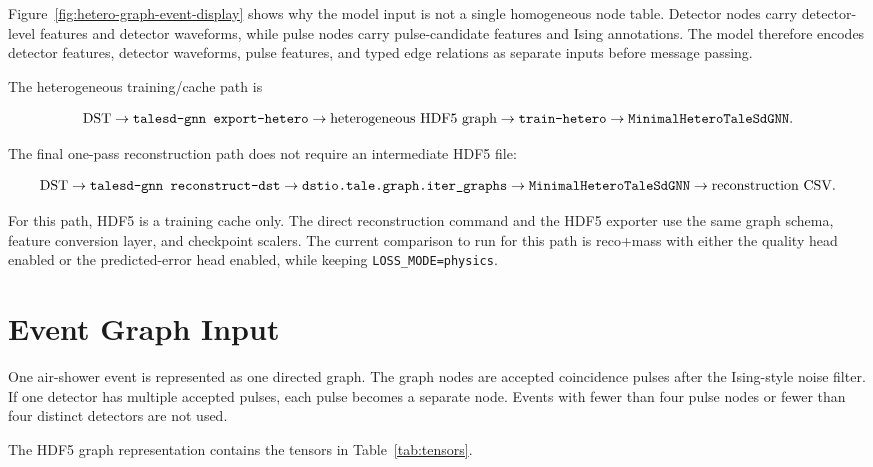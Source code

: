 \documentclass[a4paper,10pt]{article}
\newcommand{\code}[1]{\ifmmode\text{\ttfamily #1}\else\texttt{#1}\fi}
\begin{document}
Figure~\ref{fig:hetero-graph-event-display} shows why the model input is not a single homogeneous node table.
Detector nodes carry detector-level features and detector waveforms, while pulse nodes carry pulse-candidate features and Ising annotations.
The model therefore encodes detector features, detector waveforms, pulse features, and typed edge relations as separate inputs before message passing.

The heterogeneous training/cache path is
\begin{footnotesize}
\[
\mathrm{DST}
\rightarrow
\code{talesd-gnn export-hetero}
\rightarrow
\mathrm{heterogeneous\ HDF5\ graph}
\rightarrow
\code{train-hetero}
\rightarrow
\code{MinimalHeteroTaleSdGNN}.
\]
\end{footnotesize}
The final one-pass reconstruction path does not require an intermediate HDF5 file:
\begin{footnotesize}
\[
\mathrm{DST}
\rightarrow
\code{talesd-gnn reconstruct-dst}
\rightarrow
\code{dstio.tale.graph.iter\_graphs}
\rightarrow
\code{MinimalHeteroTaleSdGNN}
\rightarrow
\mathrm{reconstruction\ CSV}.
\]
\end{footnotesize}
For this path, HDF5 is a training cache only.
The direct reconstruction command and the HDF5 exporter use the same graph schema, feature conversion layer, and checkpoint scalers.
The current comparison to run for this path is reco+mass with either the quality head enabled or the predicted-error head enabled, while keeping \code{LOSS\_MODE=physics}.

\section{Event Graph Input}

One air-shower event is represented as one directed graph.
The graph nodes are accepted coincidence pulses after the Ising-style noise filter.
If one detector has multiple accepted pulses, each pulse becomes a separate node.
Events with fewer than four pulse nodes or fewer than four distinct detectors are not used.

The HDF5 graph representation contains the tensors in Table~\ref{tab:tensors}.
\end{document}
